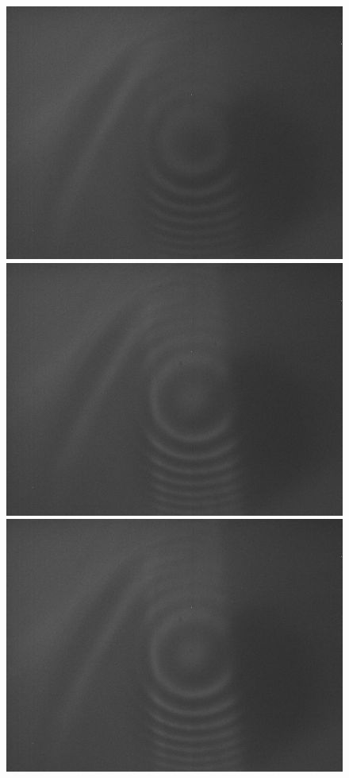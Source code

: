 \documentclass{article}
\begin{document}
\begin{figure}[H]
    \includegraphics[scale = 0.1]{6.jpg}
    \includegraphics[scale = 0.1]{7.jpg}
    \includegraphics[scale = 0.1]{8.jpg}

\end{figure}
\end{document}
